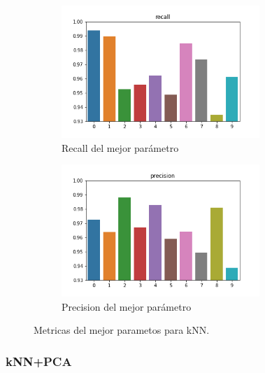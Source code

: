 \begin{figure}[H]
\begin{subfigure}{0.5\textwidth}
\includegraphics[width=0.9\linewidth, height=5cm]{images/recall_knn.png} 
\caption{Recall del mejor parámetro}
\end{subfigure}
\begin{subfigure}{0.5\textwidth}
\includegraphics[width=0.9\linewidth, height=5cm]{images/precision_knn.png} 
\caption{Precision del mejor parámetro}
\end{subfigure}
\caption{Metricas del mejor parametos para kNN.}
\label{knn_metricas}%
\end{figure}





\subsubsection{kNN+PCA}


